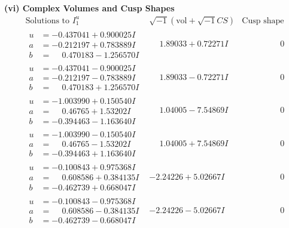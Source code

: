 \documentclass[1p]{elsarticle_modified}
\theoremstyle{definition}
\newcommand{\I}{\sqrt{-1}}
\begin{document}
\newpage\flushleft \textbf{(vi) Complex Volumes and Cusp Shapes}
$$\begin{array}{c|c|c}  
\text{Solutions to }I^u_{1}& \I (\text{vol} + \sqrt{-1}CS) & \text{Cusp shape}\\
 \hline 
\begin{aligned}
u &= -0.437041 + 0.900025 I \\
a &= -0.212197 + 0.783889 I \\
b &= \phantom{-}0.470183 - 1.256570 I\end{aligned}
 & \phantom{-}1.89033 + 0.72271 I & \phantom{-0.000000 } 0 \\ \hline\begin{aligned}
u &= -0.437041 - 0.900025 I \\
a &= -0.212197 - 0.783889 I \\
b &= \phantom{-}0.470183 + 1.256570 I\end{aligned}
 & \phantom{-}1.89033 - 0.72271 I & \phantom{-0.000000 } 0 \\ \hline\begin{aligned}
u &= -1.003990 + 0.150540 I \\
a &= \phantom{-}0.46765 + 1.53202 I \\
b &= -0.394463 - 1.163640 I\end{aligned}
 & \phantom{-}1.04005 - 7.54869 I & \phantom{-0.000000 } 0 \\ \hline\begin{aligned}
u &= -1.003990 - 0.150540 I \\
a &= \phantom{-}0.46765 - 1.53202 I \\
b &= -0.394463 + 1.163640 I\end{aligned}
 & \phantom{-}1.04005 + 7.54869 I & \phantom{-0.000000 } 0 \\ \hline\begin{aligned}
u &= -0.100843 + 0.975368 I \\
a &= \phantom{-}0.608586 + 0.384135 I \\
b &= -0.462739 + 0.668047 I\end{aligned}
 & -2.24226 + 5.02667 I & \phantom{-0.000000 } 0 \\ \hline\begin{aligned}
u &= -0.100843 - 0.975368 I \\
a &= \phantom{-}0.608586 - 0.384135 I \\
b &= -0.462739 - 0.668047 I\end{aligned}
 & -2.24226 - 5.02667 I & \phantom{-0.000000 } 0 \\ \hline\begin{aligned}

\end{aligned}
\end{array}$$
\end{document}
